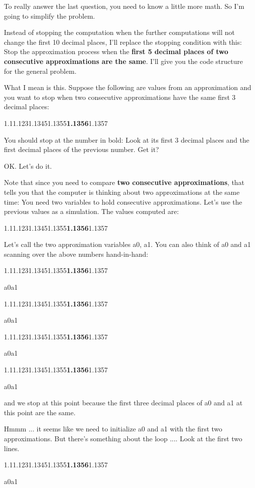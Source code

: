 \documentclass[
]{article}
\begin{document}
To really answer the last question, you need to know a little more math.
So I'm going to simplify the problem.

Instead of stopping the computation when the further computations will
not change the first 10 decimal places, I'll replace the stopping
condition with this: Stop the approximation process when the
\textbf{first 5 decimal places of two consecutive approximations are the
same}. I'll give you the code structure for the general problem.

What I mean is this. Suppose the following are values from an
approximation and you want to stop when two consecutive approximations
have the same first 3 decimal places:

1.11.1231.13451.1355\textbf{1.1356}1.1357

You should stop at the number in bold: Look at its first 3 decimal
places and the first decimal places of the previous number. Get it?

OK. Let's do it.

Note that since you need to compare \textbf{two consecutive
approximations}, that tells you that the computer is thinking about two
approximations at the same time: You need two variables to hold
consecutive approximations. Let's use the previous values as a
simulation. The values computed are:

1.11.1231.13451.1355\textbf{1.1356}1.1357

Let's call the two approximation variables a0, a1. You can also think of
a0 and a1 scanning over the above numbers hand-in-hand:

1.11.1231.13451.1355\textbf{1.1356}1.1357

a0a1

1.11.1231.13451.1355\textbf{1.1356}1.1357

a0a1

1.11.1231.13451.1355\textbf{1.1356}1.1357

a0a1

1.11.1231.13451.1355\textbf{1.1356}1.1357

a0a1

and we stop at this point because the first three decimal places of a0
and a1 at this point are the same.

Hmmm ... it seems like we need to initialize a0 and a1 with the first
two approximations. But there's something about the loop .... Look at
the first two lines.

1.11.1231.13451.1355\textbf{1.1356}1.1357

a0a1
\end{document}
